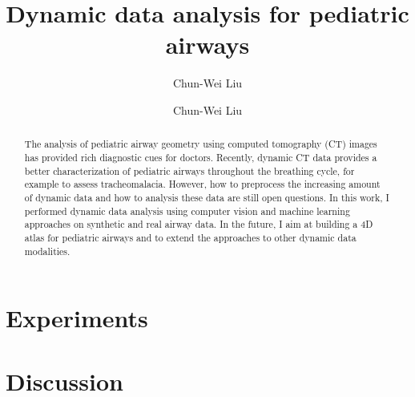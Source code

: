 \documentclass{llncs}
\begin{document}
%
\frontmatter          %
%
\pagestyle{empty}  %
%
\mainmatter              %
%
\title{Dynamic data analysis for pediatric airways}
%
%
\author{Chun-Wei Liu}
%
%
%

\author{Chun-Wei Liu}

\maketitle              %

\begin{abstract}
The analysis of pediatric airway geometry using computed tomography (CT) images has provided rich diagnostic cues for doctors. Recently, dynamic CT data provides a better characterization of pediatric airways throughout the breathing cycle, for example to assess tracheomalacia. However, how to preprocess the increasing amount of dynamic data and how to analysis these data are still open questions. In this work, I performed dynamic data analysis using computer vision and machine learning approaches on synthetic and real airway data. In the future, I aim at building a 4D atlas for pediatric airways and to extend the approaches to other dynamic data modalities.
\end{abstract}




\section{Experiments}
\label{sec:experiments}


\section{Discussion}
\label{sec:discussion}



\end{document}
